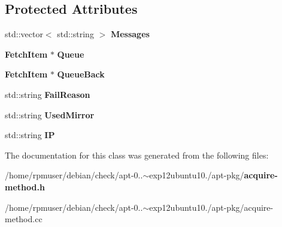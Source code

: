 \subsection*{\-Protected \-Attributes}
\begin{DoxyCompactItemize}
\item 
std\-::vector$<$ std\-::string $>$ {\bfseries \-Messages}\label{classpkgAcqMethod_a43a2b67cf6f78f2d5f0c0f3bb6edb0b1}

\item 
{\bf \-Fetch\-Item} $\ast$ {\bfseries \-Queue}\label{classpkgAcqMethod_aa467b639088af80da587d95ef79e5558}

\item 
{\bf \-Fetch\-Item} $\ast$ {\bfseries \-Queue\-Back}\label{classpkgAcqMethod_a31e05fdc9cbcbe7f4b16067036ecad9a}

\item 
std\-::string {\bfseries \-Fail\-Reason}\label{classpkgAcqMethod_a7aeb9fc72e53c123e9f36d4d6058bec8}

\item 
std\-::string {\bfseries \-Used\-Mirror}\label{classpkgAcqMethod_a0fc192c0b613d93b4ed6ddf53d2b011d}

\item 
std\-::string {\bfseries \-I\-P}\label{classpkgAcqMethod_a57430442c3d9a40c976af8e13ab34029}

\end{DoxyCompactItemize}


\-The documentation for this class was generated from the following files\-:\begin{DoxyCompactItemize}
\item 
/home/rpmuser/debian/check/apt-\/0..$\sim$exp12ubuntu10./apt-\/pkg/{\bf acquire-\/method.\-h}\item 
/home/rpmuser/debian/check/apt-\/0..$\sim$exp12ubuntu10./apt-\/pkg/acquire-\/method.\-cc\end{DoxyCompactItemize}
